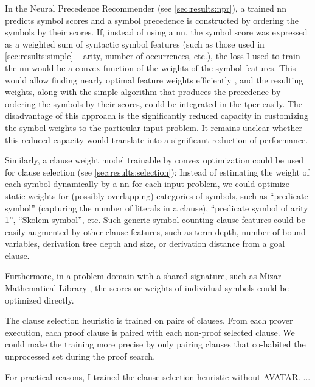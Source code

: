 In the Neural Precedence Recommender (see \cref{sec:results:npr}),
a trained \gls{nn} predicts symbol scores and
a symbol precedence is constructed by ordering the symbols by their scores.
If, instead of using a \gls{nn}, the symbol score was expressed as a weighted sum of syntactic symbol features (such as those used in \cref{sec:results:simple} -- arity, number of occurrences, etc.),
the loss I used to train the \gls{nn} would be a convex function of the weights of the symbol features.
This would allow finding nearly optimal feature weights efficiently \cite{},
and the resulting weights, along with the simple algorithm that produces the precedence by ordering the symbols by their scores,
could be integrated in the \gls{tper} easily.
The disadvantage of this approach is the significantly reduced capacity in customizing the symbol weights to the particular input problem.
It remains unclear whether this reduced capacity would translate into a significant reduction of performance.

Similarly, a clause weight model trainable by convex optimization could be used for clause selection (see \cref{sec:results:selection}):
Instead of estimating the weight of each symbol dynamically by a \gls{nn} for each input problem,
we could optimize static weights for (possibly overlapping) categories of symbols,
such as
\enquote{predicate symbol} (capturing the number of literals in a clause),
\enquote{predicate symbol of arity 1},
\enquote{Skolem symbol}, etc.
Such generic symbol-counting clause features could be easily augmented by other clause features,
such as term depth, number of bound variables, derivation tree depth and size, or derivation distance from a goal clause.

Furthermore, in a problem domain with a shared signature, such as Mizar Mathematical Library \cite{},
the scores or weights of individual symbols could be optimized directly.

The clause selection heuristic is trained on pairs of clauses.
From each prover execution, each proof clause is paired with each non-proof selected clause.
We could make the training more precise by only pairing clauses that co-habited the unprocessed set during the proof search.

For practical reasons, I trained the clause selection heuristic without AVATAR. ...

